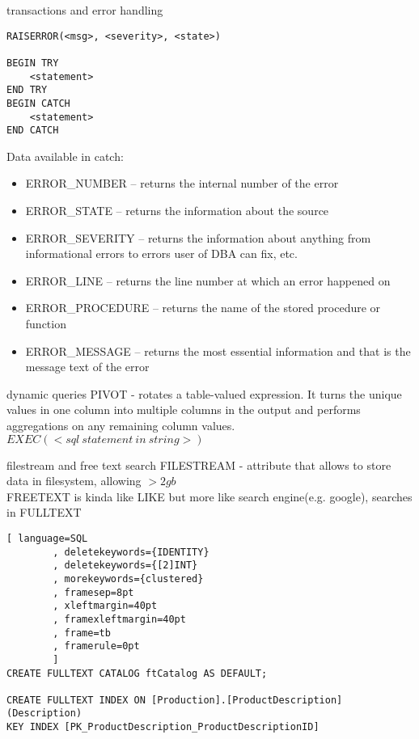 \documentclass{article}
\begin{document}
\begin{section}{transactions and error handling}
\begin{lstlisting}
RAISERROR(<msg>, <severity>, <state>)

BEGIN TRY
    <statement>
END TRY
BEGIN CATCH
    <statement>
END CATCH
        \end{lstlisting}

        Data available in catch:
        \begin{itemize}
            \item ERROR\_NUMBER – returns the internal number of the error
            \item ERROR\_STATE – returns the information about the source
            \item ERROR\_SEVERITY – returns the information about anything from informational errors to errors 
                user of DBA can fix, etc.
            \item ERROR\_LINE – returns the line number at which an error happened on
            \item ERROR\_PROCEDURE – returns the name of the stored procedure or function
            \item ERROR\_MESSAGE – returns the most essential information and that is the message text of the error
        
        \end{itemize}
        

    \end{section}
    \begin{section}{dynamic queries}
        PIVOT - rotates a table-valued expression. It 
        turns the unique values in one column into multiple 
        columns in the output and performs aggregations on any 
        remaining column values.
        $EXEC(<sql~statement~in~string>)$
    
    \end{section}
    \begin{section}{filestream and free text search}
    FILESTREAM - attribute that allows to store data in filesystem, allowing $>2gb$ \\
    FREETEXT is kinda like LIKE but more like search engine(e.g. google), searches in FULLTEXT
    
    \begin{lstlisting}[ language=SQL
        , deletekeywords={IDENTITY}
        , deletekeywords={[2]INT}
        , morekeywords={clustered}
        , framesep=8pt
        , xleftmargin=40pt
        , framexleftmargin=40pt
        , frame=tb
        , framerule=0pt 
        ]
CREATE FULLTEXT CATALOG ftCatalog AS DEFAULT;

CREATE FULLTEXT INDEX ON [Production].[ProductDescription](Description)
KEY INDEX [PK_ProductDescription_ProductDescriptionID]
    \end{lstlisting}

    \end{section}
\end{document}
